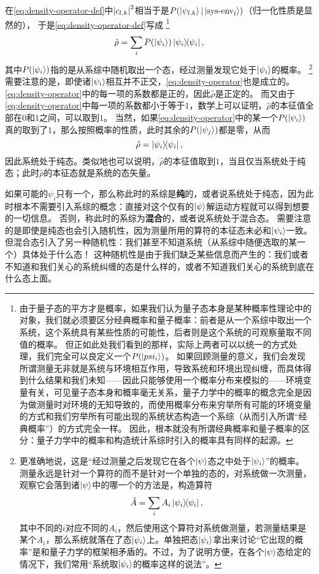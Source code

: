 \documentclass[hyperref, UTF8, a4paper]{ctexart}
\begin{document}
在\eqref{eq:density-operator-def}中$\abs{c_{l, k}}^2$相当于是$P(\ket{\psi_{l, k}}|\ket{\text{sys-env}_l})$（归一化性质是显然的），
于是\eqref{eq:density-operator-def}写成%
\footnote{由于量子态的平方才是概率，如果我们认为量子态本身是某种概率性理论中的对象，我们就必须要区分经典概率和量子概率：前者是从一个系综中取出一个系统，这个系统具有某些性质的可能性，后者则是这个系统的可观察量取不同值的概率。
但正如此处我们看到的那样，实际上两者可以以统一的方式处理，我们完全可以良定义一个$P(\ket{psi_i})$。
如果回顾测量的意义，我们会发现所谓测量无非就是系统与环境相互作用，导致系统和环境出现纠缠，而具体得到什么结果和我们未知——因此只能够使用一个概率分布来模拟的——环境变量有关，可见量子态本身和概率毫无关系，量子力学中的概率的概念完全是因为做测量时对环境的无知导致的，而使用概率分布来穷举所有可能的环境变量的方式和我们穷举所有可能出现的系统状态构造一个系综（从而引入所谓“经典概率”）的方式完全一样。
因此，根本就没有所谓经典概率和量子概率的区分：量子力学中的概率和构造统计系综时引入的概率具有同样的起源。}%
\begin{equation}
    \hat{\rho} = \sum_{i} P(\ket{\psi_i}) \dyad{\psi_i},
    \label{eq:density-operator}
\end{equation}
其中$P(\ket{\psi_i})$指的是从系综中随机取出一个态，经过测量发现它处于$\ket{\psi_i}$的概率。%
\footnote{更准确地说，这是“经过测量之后发现它在各个$\ket{\psi}$态之中处于$\ket{\psi_i}$”的概率。
测量永远是针对一个算符的而不是针对一个单独的态的，对系统做一次测量，观察它会落到诸$\ket{\psi}$中的哪一个的方法是，构造算符
\[
    \hat{A} = \sum_i A_i \dyad{\psi_i},
\]
其中不同的$i$对应不同的$A_i$，然后使用这个算符对系统做测量，若测量结果是某个$A_i$，那么系统就落在了态$\ket{\psi_i}$上。单独把态$\ket{\psi_i}$拿出来讨论“它出现的概率”是和量子力学的框架相矛盾的。不过，为了说明方便，在各个$\ket{\psi}$态给定的情况下，我们常用“系统取$\ket{\psi_i}$的概率这样的说法”。}%
需要注意的是，即使诸$\ket{\psi_i}$相互并不正交，\eqref{eq:density-operator}也是成立的。
\eqref{eq:density-operator}中的每一项的系数都是正的，因此$\hat{\rho}$是正定的。
而又由于\eqref{eq:density-operator}中每一项的系数都小于等于$1$，数学上可以证明，$\hat{\rho}$的本征值全部在$0$和$1$之间，可以取到$1$。
当然，如果\eqref{eq:density-operator}中的某一个$P(\ket{\psi_i})$真的取到了$1$，那么按照概率的性质，此时其余的$P(\ket{\psi_j})$都是零，从而
\[
    \hat{\rho} = \dyad{\psi_i},
\]
因此系统处于纯态。类似地也可以说明，$\hat{\rho}$的本征值取到$1$，当且仅当系统处于纯态；此时$\hat{\rho}$的本征态就是系统的态矢量。

如果可能的$\psi_i$只有一个，那么称此时的系综是\textbf{纯}的，或者说系统处于纯态，因为此时根本不需要引入系综的概念：直接对这个仅有的$\ket{\psi}$解运动方程就可以得到想要的一切信息。
否则，称此时的系综为\textbf{混合}的，或者说系统处于混合态。
需要注意的是即使是纯态也会引入随机性，因为测量所用的算符的本征态未必和$\ket{\psi_i}$一致。
但混合态引入了另一种随机性：我们甚至不知道系统（从系综中随便选取的某一个）具体处于什么态！
这种随机性是由于我们缺乏某些信息而产生的：我们或者不知道和我们关心的系统纠缠的态是什么样的，或者不知道我们关心的系统到底在什么态上面。
\end{document}
